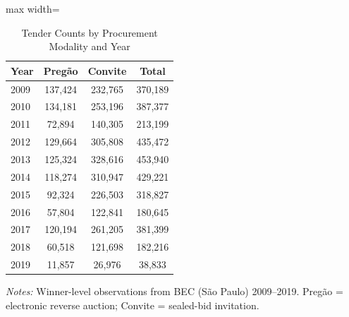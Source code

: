 \begin{table}[htbp]
\centering
\caption{Tender Counts by Procurement Modality and Year}
\label{tab:modality_year}
\begin{adjustbox}{max width=\textwidth}
\begin{threeparttable}
\small
\begin{tabular}{lccc}
\toprule
Year & Preg\~{a}o & Convite & Total \\
\midrule
2009 & 137,424 & 232,765 & 370,189 \\
2010 & 134,181 & 253,196 & 387,377 \\
2011 & 72,894 & 140,305 & 213,199 \\
2012 & 129,664 & 305,808 & 435,472 \\
2013 & 125,324 & 328,616 & 453,940 \\
2014 & 118,274 & 310,947 & 429,221 \\
2015 & 92,324 & 226,503 & 318,827 \\
2016 & 57,804 & 122,841 & 180,645 \\
2017 & 120,194 & 261,205 & 381,399 \\
2018 & 60,518 & 121,698 & 182,216 \\
2019 & 11,857 & 26,976 & 38,833 \\
\bottomrule
\end{tabular}
\begin{tablenotes}
\small
\item \textit{Notes:} Winner-level observations from BEC (S\~{a}o Paulo) 2009--2019.
Preg\~{a}o = electronic reverse auction; Convite = sealed-bid invitation.
\end{tablenotes}
\end{threeparttable}
\end{adjustbox}
\end{table}

